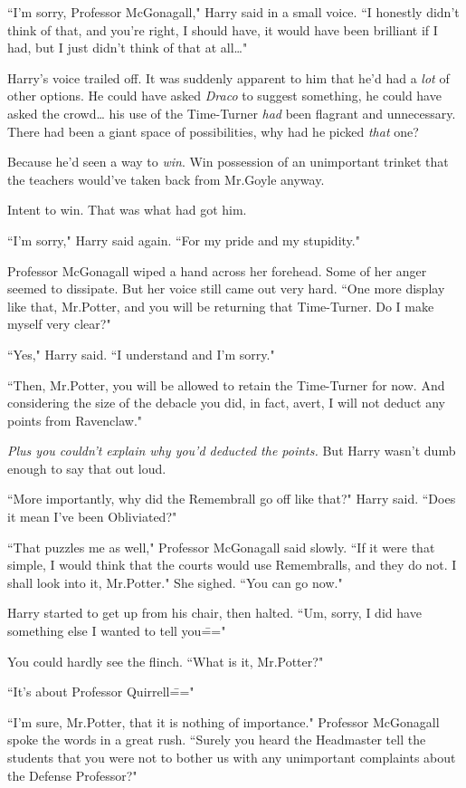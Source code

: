 ``I'm sorry, Professor McGonagall," Harry said in a small voice. ``I honestly didn't think of that, and you're right, I should have, it would have been brilliant if I had, but I just didn't think of that at all{\ldots}"

Harry's voice trailed off. It was suddenly apparent to him that he'd had a \emph{lot} of other options. He could have asked \emph{Draco} to suggest something, he could have asked the crowd{\ldots} his use of the Time-Turner \emph{had} been flagrant and unnecessary. There had been a giant space of possibilities, why had he picked \emph{that} one?

Because he'd seen a way to \emph{win}. Win possession of an unimportant trinket that the teachers would've taken back from Mr.\?Goyle anyway.

Intent to win. That was what had got him.

``I'm sorry," Harry said again. ``For my pride and my stupidity."

Professor McGonagall wiped a hand across her forehead. Some of her anger seemed to dissipate. But her voice still came out very hard. ``One more display like that, Mr.\?Potter, and you will be returning that Time-Turner. Do I make myself very clear?"

``Yes," Harry said. ``I understand and I'm sorry."

``Then, Mr.\?Potter, you will be allowed to retain the Time-Turner for now. And considering the size of the debacle you did, in fact, avert, I will not deduct any points from Ravenclaw."

\emph{Plus you couldn't explain why you'd deducted the points.} But Harry wasn't dumb enough to say that out loud.

``More importantly, why did the Remembrall go off like that?" Harry said. ``Does it mean I've been Obliviated?"

``That puzzles me as well," Professor McGonagall said slowly. ``If it were that simple, I would think that the courts would use Remembralls, and they do not. I shall look into it, Mr.\?Potter." She sighed. ``You can go now."

Harry started to get up from his chair, then halted. ``Um, sorry, I did have something else I wanted to tell you\==="

You could hardly see the flinch. ``What is it, Mr.\?Potter?"

``It's about Professor Quirrell\==="

``I'm sure, Mr.\?Potter, that it is nothing of importance." Professor McGonagall spoke the words in a great rush. ``Surely you heard the Headmaster tell the students that you were not to bother us with any unimportant complaints about the Defense Professor?"

